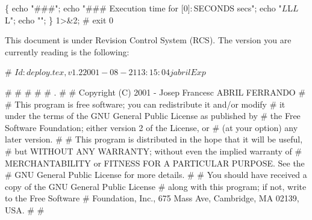 \documentclass[11pt]{article}
\def\nwendcode{\endtrivlist \endgroup} %
\let\nwdocspar=\par                    %
\begin{document}
\nwenddocs{}\endmoddef
\{ echo "###"; echo "### Execution time for [$0] : $SECONDS secs";
  echo "$L$L$L$L";
  echo ""; \} 1>&2;
#
exit 0
\nwendcode{}\nwdocspar


This document is under Revision Control System (RCS). The version you are currently reading is the following:

\nwenddocs{}\endmoddef
# $Id: deploy.tex,v 1.2 2001-08-21 13:15:04 jabril Exp $
\nwendcode{}\nwdocspar


\nwenddocs{}\endmoddef
# %
# %
# %
# 
#    .
# 
#     Copyright (C) 2001 - Josep Francesc ABRIL FERRANDO  
#
# This program is free software; you can redistribute it and/or modify
# it under the terms of the GNU General Public License as published by
# the Free Software Foundation; either version 2 of the License, or
# (at your option) any later version.
# 
# This program is distributed in the hope that it will be useful,
# but WITHOUT ANY WARRANTY; without even the implied warranty of
# MERCHANTABILITY or FITNESS FOR A PARTICULAR PURPOSE.  See the
# GNU General Public License for more details.
# 
# You should have received a copy of the GNU General Public License
# along with this program; if not, write to the Free Software
# Foundation, Inc., 675 Mass Ave, Cambridge, MA 02139, USA.
# 
# %
\nwendcode{}\nwdocspar
\end{document}
